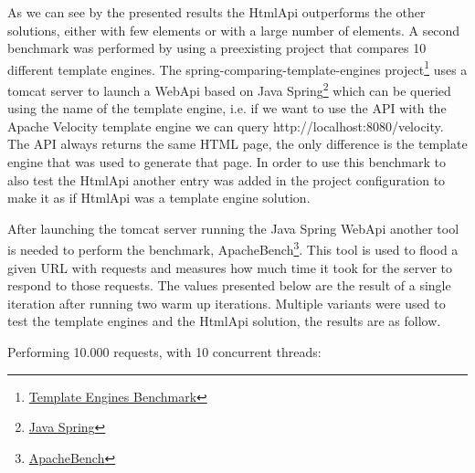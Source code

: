 \noindent
As we can see by the presented results the HtmlApi outperforms the other solutions, either with few elements or with a large number of elements. A second benchmark was performed by using a preexisting project that compares 10 different template engines. The spring-comparing-template-engines project\footnote{\href{https://github.com/jreijn/spring-comparing-template-engines}{Template Engines Benchmark}} uses a tomcat server to launch a WebApi based on Java Spring\footnote{\href{https://spring.io/}{Java Spring}} which can be queried using the name of the template engine, i.e. if we want to use the \ac{API} with the Apache Velocity template engine we  can query http://localhost:8080/velocity. The \ac{API} always returns the same \ac{HTML} page, the only difference is the template engine that was used to generate that page. In order to use this benchmark to also test the HtmlApi another entry was added in the project configuration to make it as if HtmlApi was a template engine solution. 

\noindent
After launching the tomcat server running the Java Spring WebApi another tool is needed to perform the benchmark, ApacheBench\footnote{\href{https://httpd.apache.org/docs/2.4/programs/ab.html}{ApacheBench}}. This tool is used to flood a given \ac{URL} with requests and measures how much time it took for the server to respond to those requests. The values presented below are the result of a single iteration after running two warm up iterations. Multiple variants were used to test the template engines and the HtmlApi solution, the results are as follow.

Performing 10.000 requests, with 10 concurrent threads:

